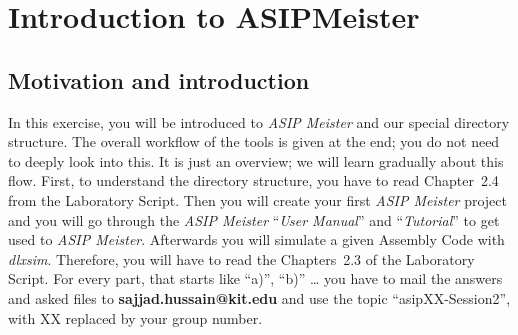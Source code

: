 
\hypertarget{introduction-to-asipmeister}{%
\chapter*{Introduction to ASIPMeister}\label{introduction-to-asipmeister}}


\section*{Motivation and introduction}

In this exercise, you will be introduced to \emph{ASIP Meister} and our
special directory structure. The overall workflow of the tools is given
at the end; you do not need to deeply look into this. It is just an
overview; we will learn gradually about this flow. First, to understand
the directory structure, you have to read Chapter~2.4 from the
Laboratory Script. Then you will create your first \emph{ASIP Meister}
project and you will go through the \emph{ASIP Meister} ``\emph{User
	Manual}'' and ``\emph{Tutorial}'' to get used to \emph{ASIP Meister}.
Afterwards you will simulate a given Assembly Code with \emph{dlxsim}.
Therefore, you will have to read the Chapters~2.3 of the Laboratory
Script. For every part, that starts like ``a)'', ``b)'' \ldots{} you
have to mail the answers and asked files to
\textbf{sajjad.hussain@kit.edu} and use the topic ``asipXX-Session2'',
with XX replaced by your group number.


